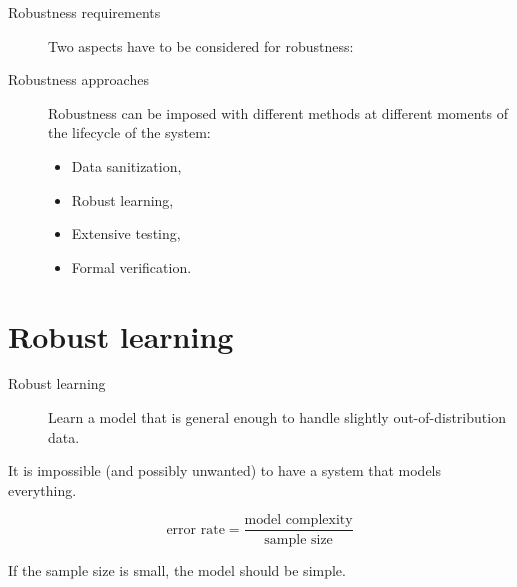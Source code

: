 \begin{description}
    \item[Robustness requirements] 
        Two aspects have to be considered for robustness:

    \item[Robustness approaches] 
        Robustness can be imposed with different methods at different moments of the lifecycle of the system:
        \begin{itemize}
            \item Data sanitization,
            \item Robust learning,
            \item Extensive testing,
            \item Formal verification.
        \end{itemize}
\end{description}


\section{Robust learning}

\begin{description}
    \item[Robust learning]
        Learn a model that is general enough to handle slightly out-of-distribution data.
\end{description}

\begin{remark}
    It is impossible (and possibly unwanted) to have a system that models everything.

    \begin{theorem}
        \[ \text{error rate} = \frac{\text{model complexity}}{\text{sample size}} \]
    \end{theorem}
    
    \begin{corollary}
        If the sample size is small, the model should be simple.
    \end{corollary}
\end{remark}

